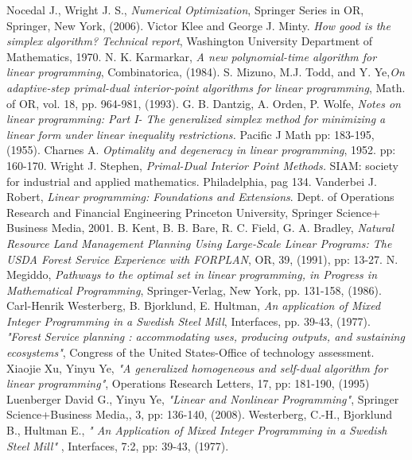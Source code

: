 \documentclass[a4paper,10 pt,titlepage,twoside]{book}
\theoremstyle{plain}
\theoremstyle{definition}
\theoremstyle{remark}
\begin{document}
\begin{thebibliography}{9}
	Nocedal J., Wright J. S., \emph{\;Numerical Optimization}, Springer Series in OR, Springer, New York, (2006).
	Victor Klee and George J. Minty.\emph{ How good is the simplex algorithm? Technical report}, Washington University Department of Mathematics, 1970.
	 N. K. Karmarkar,\emph{ A new polynomial-time algorithm for linear programming}, Combinatorica, (1984).
	 S. Mizuno, M.J. Todd, and Y. Ye,\emph{\;On adaptive-step primal-dual interior-point algorithms for linear programming}, Math. of OR, vol. 18, pp. 964-981, (1993). 
	 G. B. Dantzig, A. Orden, P. Wolfe, \emph{ Notes on linear programming: Part I- The generalized simplex method for
	minimizing a linear form under linear inequality restrictions.} Pacific J Math pp: 183-195, (1955). 
	  Charnes A. \emph{ Optimality and degeneracy in linear programming}, 1952. pp: 160-170. 
	 Wright J. Stephen, \emph{\;Primal-Dual Interior Point Methods.} SIAM: society for industrial and applied mathematics. Philadelphia, pag 134.
	 Vanderbei J. Robert, \emph{\;Linear programming:
		Foundations and Extensions}. Dept. of Operations Research and Financial Engineering
	Princeton University, Springer Science+ Business Media, 2001.
	 B. Kent, B. B. Bare, R. C. Field, G. A. Bradley, \textit{Natural Resource Land Management Planning Using Large-Scale Linear Programs: The USDA Forest Service Experience with FORPLAN}, OR, 39, (1991), pp: 13-27.
 N. Megiddo, \emph{ Pathways to the optimal set in linear programming, in Progress in
Mathematical Programming}, Springer-Verlag, New York, pp. 131-158, (1986).
 Carl-Henrik Westerberg, B. Bjorklund, E. Hultman, \emph{ An application of Mixed Integer Programming in a Swedish Steel Mill}, Interfaces, pp. 39-43, (1977).
 \emph{"Forest Service planning : accommodating uses, producing outputs, and sustaining ecosystems"}, Congress of the United States-Office of technology assessment. 
Xiaojie Xu, Yinyu Ye, \emph{"A generalized homogeneous and self-dual algorithm for linear programming"}, Operations Research Letters, 17, pp: 181-190, (1995)
Luenberger David G., Yinyu Ye, \emph{"Linear and Nonlinear Programming"}, Springer Science+Business Media,, 3, pp: 136-140, (2008).
 Westerberg, C.-H., Bjorklund B., Hultman E., \emph{" An Application of Mixed Integer Programming in a Swedish Steel Mill" }, Interfaces, 7:2, pp: 39-43, (1977).

\end{thebibliography}
\end{document}
